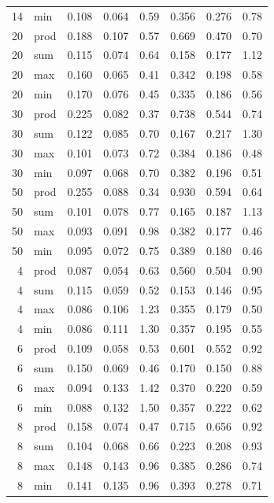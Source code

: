 \documentclass[11pt]{article}
\begin{document}
\begin{table}[H]
\begin{tabular}{@{}rlrrrrrr@{}}
        14 & min & 0.108 & 0.064 & 0.59 & 0.356 & 0.276 & 0.78 \\
        20 & prod & 0.188 & 0.107 & 0.57 & 0.669 & 0.470 & 0.70 \\
        20 & sum & 0.115 & 0.074 & 0.64 & 0.158 & 0.177 & 1.12 \\
        20 & max & 0.160 & 0.065 & 0.41 & 0.342 & 0.198 & 0.58 \\
        20 & min & 0.170 & 0.076 & 0.45 & 0.335 & 0.186 & 0.56 \\
        30 & prod & 0.225 & 0.082 & 0.37 & 0.738 & 0.544 & 0.74 \\
        30 & sum & 0.122 & 0.085 & 0.70 & 0.167 & 0.217 & 1.30 \\
        30 & max & 0.101 & 0.073 & 0.72 & 0.384 & 0.186 & 0.48 \\
        30 & min & 0.097 & 0.068 & 0.70 & 0.382 & 0.196 & 0.51 \\
        50 & prod & 0.255 & 0.088 & 0.34 & 0.930 & 0.594 & 0.64 \\
        50 & sum & 0.101 & 0.078 & 0.77 & 0.165 & 0.187 & 1.13 \\
        50 & max & 0.093 & 0.091 & 0.98 & 0.382 & 0.177 & 0.46 \\
        50 & min & 0.095 & 0.072 & 0.75 & 0.389 & 0.180 & 0.46 \\
        4 & prod & 0.087 & 0.054 & 0.63 & 0.560 & 0.504 & 0.90 \\
        4 & sum & 0.115 & 0.059 & 0.52 & 0.153 & 0.146 & 0.95 \\
        4 & max & 0.086 & 0.106 & 1.23 & 0.355 & 0.179 & 0.50 \\
        4 & min & 0.086 & 0.111 & 1.30 & 0.357 & 0.195 & 0.55 \\
        6 & prod & 0.109 & 0.058 & 0.53 & 0.601 & 0.552 & 0.92 \\
        6 & sum & 0.150 & 0.069 & 0.46 & 0.170 & 0.150 & 0.88 \\
        6 & max & 0.094 & 0.133 & 1.42 & 0.370 & 0.220 & 0.59 \\
        6 & min & 0.088 & 0.132 & 1.50 & 0.357 & 0.222 & 0.62 \\
        8 & prod & 0.158 & 0.074 & 0.47 & 0.715 & 0.656 & 0.92 \\
        8 & sum & 0.104 & 0.068 & 0.66 & 0.223 & 0.208 & 0.93 \\
        8 & max & 0.148 & 0.143 & 0.96 & 0.385 & 0.286 & 0.74 \\
        8 & min & 0.141 & 0.135 & 0.96 & 0.393 & 0.278 & 0.71 \\

\end{tabular}
\end{table}
\end{document}
